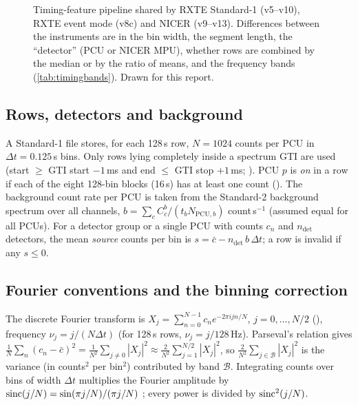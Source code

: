 \begin{figure}[htbp]
\caption[Timing-feature pipeline]{Timing-feature pipeline shared by RXTE Standard-1 (v5--v10), RXTE event mode (v8c) and
NICER (v9--v13). Differences between the instruments are in the bin width, the segment length, the ``detector'' (PCU or
NICER MPU), whether rows are combined by the median or by the ratio of means, and the frequency bands
(\cref{tab:timingbands}). Drawn for this report.}
\label{fig:timingpipeline}
\end{figure}

\subsection{Rows, detectors and background}
A Standard-1 file stores, for each 128\,s row, $N=1024$ counts per PCU in $\Delta t = 0.125$\,s bins. Only rows lying
completely inside a spectrum GTI are used (start $\ge$ GTI start $-1$\,ms and end $\le$ GTI stop $+1$\,ms;
). PCU $p$ is \emph{on} in a row if each of the eight 128-bin blocks (16\,s) has at least one count
(). The background count rate per PCU is taken from the Standard-2 background spectrum over all
channels, $b = \sum_c C^b_c/(t_b N_{\mathrm{PCU},b})$ count\,s$^{-1}$ (assumed equal for all PCUs). For a detector group
or a single PCU with counts $c_n$ and $n_\mathrm{det}$ detectors, the mean \emph{source} counts per bin is
$s = \bar c - n_\mathrm{det}\, b\,\Delta t$; a row is invalid if any $s\le0$.

\subsection{Fourier conventions and the binning correction}
The discrete Fourier transform is $X_j = \sum_{n=0}^{N-1} c_n e^{-2\pi i jn/N}$, $j=0,\dots,N/2$ (),
frequency $\nu_j = j/(N\Delta t)$ (for 128\,s rows, $\nu_j = j/128$\,Hz). Parseval's relation gives
$\frac{1}{N}\sum_n (c_n-\bar c)^2 = \frac{1}{N^2}\sum_{j\ne0}|X_j|^2 \approx \frac{2}{N^2}\sum_{j=1}^{N/2}|X_j|^2$,
so $\frac{2}{N^2}\sum_{j\in\mathcal B}|X_j|^2$ is the variance (in counts$^2$ per bin$^2$) contributed by band
$\mathcal B$. Integrating counts over bins of width $\Delta t$ multiplies the Fourier amplitude by
$\operatorname{sinc}(j/N) = \sin(\pi j/N)/(\pi j/N)$ \citep[Eq.~2.19]{vanderKlis1989}; every power is divided by $\operatorname{sinc}^2(j/N)$.

